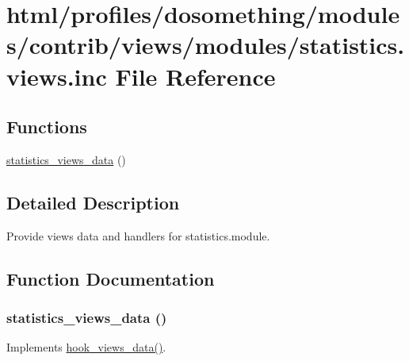 \hypertarget{statistics_8views_8inc}{
\section{html/profiles/dosomething/modules/contrib/views/modules/statistics.views.inc File Reference}
\label{statistics_8views_8inc}
}
\subsection*{Functions}
\begin{DoxyCompactItemize}
\item 
\hyperlink{statistics_8views_8inc_a9300ca230bb34c089e59aa4c0ff3e1dc}{statistics\_\-views\_\-data} ()
\end{DoxyCompactItemize}


\subsection{Detailed Description}
Provide views data and handlers for statistics.module. 

\subsection{Function Documentation}
\hypertarget{statistics_8views_8inc_a9300ca230bb34c089e59aa4c0ff3e1dc}{
\subsubsection[{statistics\_\-views\_\-data}]{\setlength{\rightskip}{0pt plus 5cm}statistics\_\-views\_\-data ()}}
\label{statistics_8views_8inc_a9300ca230bb34c089e59aa4c0ff3e1dc}
Implements \hyperlink{group__views__hooks_ga227057901681e4a33e33c199c7a8c989}{hook\_\-views\_\-data()}. 